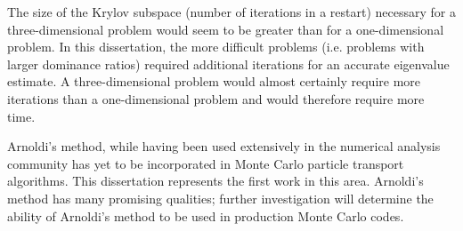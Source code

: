 The size of the Krylov subspace (number of iterations in a restart) necessary for a three-dimensional problem would seem to be greater than for a one-dimensional problem.  In this dissertation, the more difficult problems (i.e. problems with larger dominance ratios) required additional iterations for an accurate eigenvalue estimate.  A three-dimensional problem would almost certainly require more iterations than a one-dimensional problem and would therefore require more time.  

Arnoldi's method, while having been used extensively in the numerical analysis community has yet to be incorporated in Monte Carlo particle transport algorithms.  This dissertation represents the first work in this area.  Arnoldi's method has many promising qualities; further investigation will determine the ability of Arnoldi's method to be used in production Monte Carlo codes.
